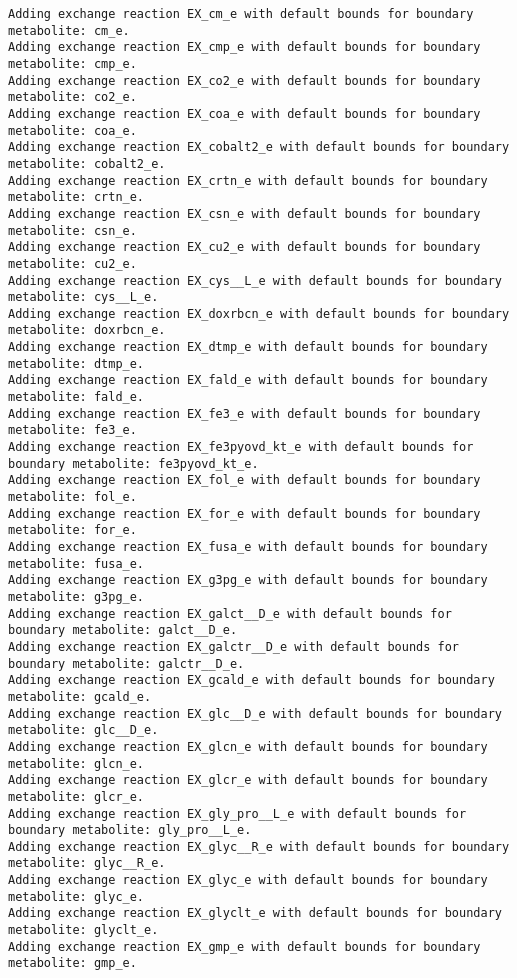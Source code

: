 \documentclass[
  letterpaper,
  DIV=11,
  numbers=noendperiod]{scrartcl}
\begin{document}
\begin{verbatim}
Adding exchange reaction EX_cm_e with default bounds for boundary metabolite: cm_e.
Adding exchange reaction EX_cmp_e with default bounds for boundary metabolite: cmp_e.
Adding exchange reaction EX_co2_e with default bounds for boundary metabolite: co2_e.
Adding exchange reaction EX_coa_e with default bounds for boundary metabolite: coa_e.
Adding exchange reaction EX_cobalt2_e with default bounds for boundary metabolite: cobalt2_e.
Adding exchange reaction EX_crtn_e with default bounds for boundary metabolite: crtn_e.
Adding exchange reaction EX_csn_e with default bounds for boundary metabolite: csn_e.
Adding exchange reaction EX_cu2_e with default bounds for boundary metabolite: cu2_e.
Adding exchange reaction EX_cys__L_e with default bounds for boundary metabolite: cys__L_e.
Adding exchange reaction EX_doxrbcn_e with default bounds for boundary metabolite: doxrbcn_e.
Adding exchange reaction EX_dtmp_e with default bounds for boundary metabolite: dtmp_e.
Adding exchange reaction EX_fald_e with default bounds for boundary metabolite: fald_e.
Adding exchange reaction EX_fe3_e with default bounds for boundary metabolite: fe3_e.
Adding exchange reaction EX_fe3pyovd_kt_e with default bounds for boundary metabolite: fe3pyovd_kt_e.
Adding exchange reaction EX_fol_e with default bounds for boundary metabolite: fol_e.
Adding exchange reaction EX_for_e with default bounds for boundary metabolite: for_e.
Adding exchange reaction EX_fusa_e with default bounds for boundary metabolite: fusa_e.
Adding exchange reaction EX_g3pg_e with default bounds for boundary metabolite: g3pg_e.
Adding exchange reaction EX_galct__D_e with default bounds for boundary metabolite: galct__D_e.
Adding exchange reaction EX_galctr__D_e with default bounds for boundary metabolite: galctr__D_e.
Adding exchange reaction EX_gcald_e with default bounds for boundary metabolite: gcald_e.
Adding exchange reaction EX_glc__D_e with default bounds for boundary metabolite: glc__D_e.
Adding exchange reaction EX_glcn_e with default bounds for boundary metabolite: glcn_e.
Adding exchange reaction EX_glcr_e with default bounds for boundary metabolite: glcr_e.
Adding exchange reaction EX_gly_pro__L_e with default bounds for boundary metabolite: gly_pro__L_e.
Adding exchange reaction EX_glyc__R_e with default bounds for boundary metabolite: glyc__R_e.
Adding exchange reaction EX_glyc_e with default bounds for boundary metabolite: glyc_e.
Adding exchange reaction EX_glyclt_e with default bounds for boundary metabolite: glyclt_e.
Adding exchange reaction EX_gmp_e with default bounds for boundary metabolite: gmp_e.

\end{verbatim}
\end{document}
